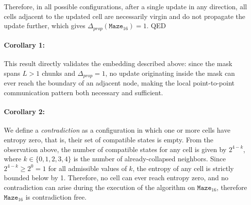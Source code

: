 Therefore, in all possible configurations, after a single update in any
direction, all cells adjacent to the updated cell are necessarily virgin and
do not propagate the update further, which gives
$\Delta_{prop}(\texttt{Maze}_{16}) = 1$. QED


\paragraph{Corollary 1:}
This result directly validates the embedding described above: since the mask
spans $L > 1$ chunks and $\Delta_{prop} = 1$, no update originating inside
the mask can ever reach the boundary of an adjacent node, making the local
point-to-point communication pattern both necessary and sufficient.

\paragraph{Corollary 2:}
We define a \textit{contradiction} as a configuration in which one or more
cells have entropy zero, that is, their set of compatible states is empty.
From the observation above, the number of compatible states for any cell is
given by $2^{4-k}$, where $k \in \{0, 1, 2, 3, 4\}$ is the number of
already-collapsed neighbors. Since $2^{4-k} \geq 2^0 = 1$ for all admissible
values of $k$, the entropy of any cell is strictly bounded below by 1.
Therefore, no cell can ever reach entropy zero, and no contradiction can arise
during the execution of the algorithm on $\texttt{Maze}_{16}$, therefore $\texttt{Maze}_{16}$ is contradiction free.